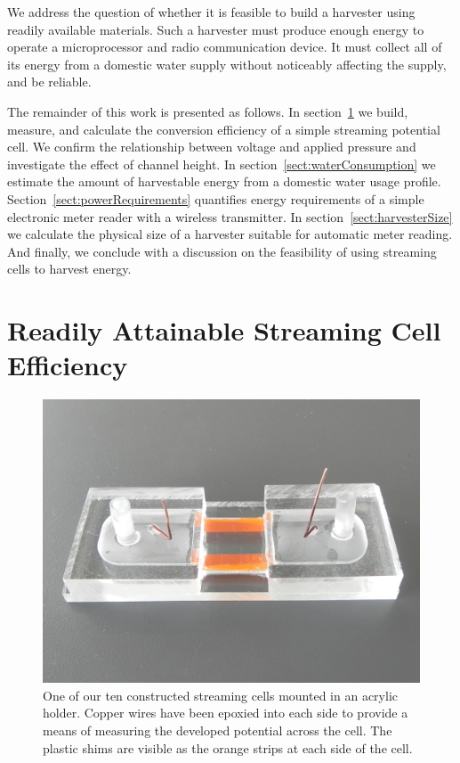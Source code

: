 \documentclass[10pt,final,journal]{IEEEtran}
\begin{document}
    We address the question of whether it is feasible to build a harvester using readily available materials.
    Such a harvester must produce enough energy to operate a microprocessor and radio communication device.
    It must collect all of its energy from a domestic water supply without noticeably affecting the supply, and be reliable.

    The remainder of this work is presented as follows.
    In section~\ref{sect:streamingCell} we build, measure, and calculate the conversion efficiency of a simple streaming potential cell.
    We confirm the relationship between voltage and applied pressure and investigate the effect of channel height.
    In section~\ref{sect:waterConsumption} we estimate the amount of harvestable energy from a domestic water usage profile.
    Section~\ref{sect:powerRequirements} quantifies energy requirements of a simple electronic meter reader with a wireless transmitter.
    In section~\ref{sect:harvesterSize} we calculate the physical size of a harvester suitable for automatic meter reading.
    And finally, we conclude with a discussion on the feasibility of using streaming cells to harvest energy.

    \section{Readily Attainable Streaming Cell Efficiency} \label{sect:streamingCell}
    \begin{figure}
        \begin{center}
        \includegraphics[width=\linewidth]{Photo_streamingPotential_Assembly_Step3.JPG}
        \end{center}
        \caption{One of our ten constructed streaming cells mounted in an acrylic holder. Copper wires have been epoxied into each side to provide a means of measuring the developed potential across the cell. The plastic shims are visible as the orange strips at each side of the cell.}
        \label{fig:cell}
    \end{figure}
\end{document}
